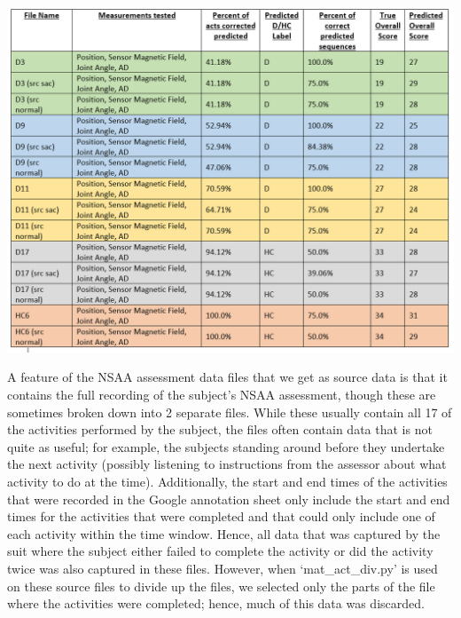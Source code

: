 \documentclass[12pt,twoside]{report}
\begin{document}
\begin{center}
\includegraphics[scale=0.5]{project_figures/fig11_16}
\end{center}

\quad A feature of the NSAA assessment data files that we get as source data is that it contains the full recording of the subject’s NSAA assessment, though these are sometimes broken down into 2 separate files. While these usually contain all 17 of the activities performed by the subject, the files often contain data that is not quite as useful; for example, the subjects standing around before they undertake the next activity (possibly listening to instructions from the assessor about what activity to do at the time). Additionally, the start and end times of the activities that were recorded in the Google annotation sheet only include the start and end times for the activities that were completed and that could only include one of each activity within the time window. Hence, all data that was captured by the suit where the subject either failed to complete the activity or did the activity twice was also captured in these files. However, when ‘mat\_act\_div.py’ is used on these source files to divide up the files, we selected only the parts of the file where the activities were completed; hence, much of this data was discarded.\\
\end{document}
